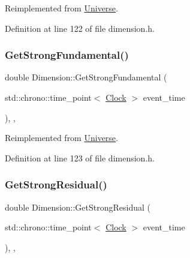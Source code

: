 Reimplemented from \mbox{\hyperlink{class_universe_acb453ce71da418c5b5617fecede9571b}{Universe}}.



Definition at line 122 of file dimension.\+h.

\mbox{\label{class_dimension_ad0d067d7f9dc4841b0ad280979ebe7af}} 
\subsubsection{\texorpdfstring{Get\+Strong\+Fundamental()}{GetStrongFundamental()}}
{\footnotesize\ttfamily double Dimension\+::\+Get\+Strong\+Fundamental (\begin{DoxyParamCaption}\item[{std\+::chrono\+::time\+\_\+point$<$ \mbox{\hyperlink{universe_8h_a0ef8d951d1ca5ab3cfaf7ab4c7a6fd80}{Clock}} $>$}]{event\+\_\+time }\end{DoxyParamCaption})\hspace{0.3cm}{\ttfamily [inline]}, {\ttfamily [final]}, {\ttfamily [virtual]}}



Reimplemented from \mbox{\hyperlink{class_universe_ab44daccba01ee7e3cf9b50bba83dd19e}{Universe}}.



Definition at line 123 of file dimension.\+h.

\mbox{\label{class_dimension_aeee6025f17d9cd1bf7f324d715a30691}} 
\subsubsection{\texorpdfstring{Get\+Strong\+Residual()}{GetStrongResidual()}}
{\footnotesize\ttfamily double Dimension\+::\+Get\+Strong\+Residual (\begin{DoxyParamCaption}\item[{std\+::chrono\+::time\+\_\+point$<$ \mbox{\hyperlink{universe_8h_a0ef8d951d1ca5ab3cfaf7ab4c7a6fd80}{Clock}} $>$}]{event\+\_\+time }\end{DoxyParamCaption})\hspace{0.3cm}{\ttfamily [inline]}, {\ttfamily [final]}, {\ttfamily [virtual]}}



